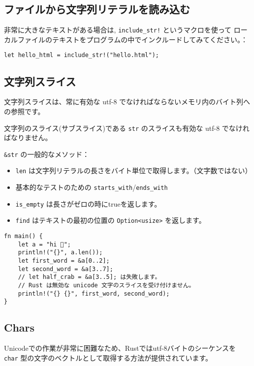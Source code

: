 \subsection{ファイルから文字列リテラルを読み込む}

非常に大きなテキストがある場合は, \texttt{include\_str!}
というマクロを使って
ローカルファイルのテキストをプログラムの中でインクルードしてみてください。：

\begin{verbatim}
let hello_html = include_str!("hello.html");
\end{verbatim}

\subsection{文字列スライス}

文字列スライスは、常に有効な utf-8
でなければならないメモリ内のバイト列への参照です。

文字列のスライス(サブスライス)である \texttt{str} のスライスも有効な
utf-8 でなければなりません。

\texttt{\&str} の一般的なメソッド：

\begin{itemize}
\item
  \texttt{len}
  は文字列リテラルの長さをバイト単位で取得します。（文字数ではない）
\item
  基本的なテストのための \texttt{starts\_with}/\texttt{ends\_with}
\item
  \texttt{is\_empty} は長さがゼロの時にtrueを返します。
\item
  \texttt{find} はテキストの最初の位置の
  \texttt{Option\textless{}usize\textgreater{}} を返します。
\end{itemize}

\begin{verbatim}
fn main() {
    let a = "hi 🦀";
    println!("{}", a.len());
    let first_word = &a[0..2];
    let second_word = &a[3..7];
    // let half_crab = &a[3..5]; は失敗します。
    // Rust は無効な unicode 文字のスライスを受け付けません。
    println!("{} {}", first_word, second_word);
}
\end{verbatim}

\subsection{Chars}

Unicodeでの作業が非常に困難なため、Rustではutf-8バイトのシーケンスを
\texttt{char} 型の文字のベクトルとして取得する方法が提供されています。

